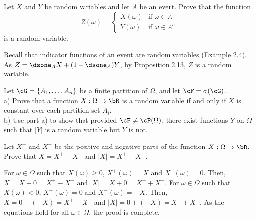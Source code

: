 \begin{exercise}
  Let $X$ and $Y$ be random variables and let $A$ be an event. Prove that the function
  \[
    Z(\omega) = \begin{cases}
      X(\omega) & \mbox{if } \omega\in A \\
      Y(\omega) & \mbox{if } \omega\in A^c
    \end{cases}
  \]
  is a random variable.
\end{exercise}
\begin{solution}
  Recall that indicator functions of an event are random variables (Example 2.4). As $Z = \dsone_A X + (1-\dsone_A) Y$, by Proposition 2.13, $Z$ is a random variable.
\end{solution}


\begin{exercise}
  Let $\cG=\{A_1,\ldots,A_n\}$ be a finite partition of $\Omega$, and let $\cF=\sigma(\cG)$. \\
  a) Prove that a function $X:\Omega\to\bR$ is a random variable if and only if $X$ is constant over each partition set $A_i$. \\
  b) Use part a) to show that provided $\cF\neq \cP(\Omega)$, there exist functions $Y$ on $\Omega$ such that $|Y|$ is a random variable but $Y$ is not.
\end{exercise}
\begin{solution}
  [TODO]
\end{solution}


\begin{exercise}
  Let $X^+$ and $X^-$ be the positive and negative parts of the function $X:\Omega\to\bR$. Prove that $X=X^+-X^-$ and $|X|=X^+ + X^-$.
\end{exercise}
\begin{solution}
  For $\omega\in\Omega$ such that $X(\omega)\geq 0$, $X^+(\omega) = X$ and $X^-(\omega)=0$. Then, $X = X - 0 = X^+ - X^-$ and $|X| = X + 0 = X^+ + X^-$. For $\omega\in\Omega$ such that $X(\omega)< 0$, $X^+(\omega)=0$ and $X^-(\omega) = -X$. Then, $X = 0 - (-X) = X^+ - X^-$ and $|X| = 0 + (-X) = X^+ + X^-$. As the equations hold for all $\omega\in\Omega$, the proof is complete.
\end{solution}
